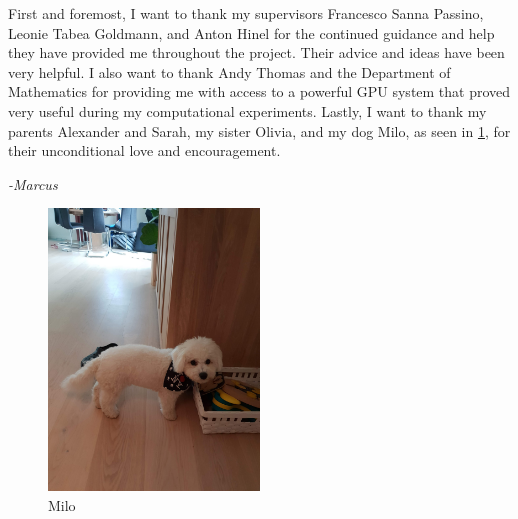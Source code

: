\documentclass{statsmsc}
\begin{document}
\begin{acknowledgements}
    First and foremost, I want to thank my supervisors Francesco Sanna Passino,
    Leonie Tabea Goldmann, and Anton Hinel for the continued guidance and help they
    have provided me throughout the project. Their advice and ideas have been very
    helpful.
    I also want to thank Andy Thomas and the Department of Mathematics for providing me with
    access to a powerful GPU system that proved very useful during my computational experiments.
    Lastly, I want to thank my parents Alexander and Sarah, my sister Olivia, and my dog Milo, as seen in
    \cref{fig:milo}, for their unconditional love and encouragement.

    \begin{flushright}
        \textit{-Marcus}
    \end{flushright}

    {
        \begin{figure}[htp]
        \begin{center}
            \vspace*{70pt}
            \includegraphics[width=0.5\textwidth,angle=-90,trim={40cm 0 5cm 0},clip]{figures/dog.jpg}
        \end{center}
        \caption{Milo}
        \vspace*{-50pt}
        \label{fig:milo}
        \end{figure}
    }
\end{acknowledgements}

{\thispagestyle{plain}
    \tableofcontents
}
\end{document}
